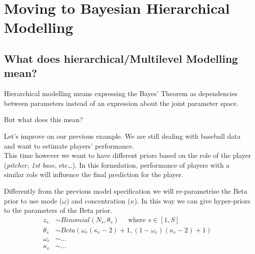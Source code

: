 \documentclass[11pt]{beamer}
\begin{document}

\section{Moving to Bayesian Hierarchical Modelling}
\subsection{What does hierarchical/Multilevel Modelling mean?}
\begin{frame}
	Hierarchical modelling means expressing the Bayes' Theorem as dependencies between parameters instead of an expression about the joint parameter space.
\end{frame}

\begin{frame}
	But what does this mean?
\end{frame}


\begin{frame}
	Let's improve on our previous example. We are still dealing with baseball data and want to estimate players' performance. \\
	This time however we want to have different priors based on the role of the player (\textit{pitcher}, \textit{1st base}, etc\dots). In this formulation, performance of players with a similar role will influence the final prediction for the player. \\
\end{frame}

\begin{frame}
	Differently from the previous model specification we will re-parametrise the Beta prior to use mode ($\omega$) and concentration ($\kappa$). In this way we can give hyper-priors to the parameters of the Beta prior.
	\begin{align}
	z_s &\sim Binomial(N_s, \theta_s) \quad \text{ where } s \in [1, S]\\
	\theta_s &\sim Beta(\omega_c (\kappa_c - 2) + 1, (1 - \omega_c) (\kappa_c - 2) + 1) \\
	\omega_c &\sim \dots \\
	\kappa_c &\sim \dots	
	\end{align}
\end{frame}
\end{document}
